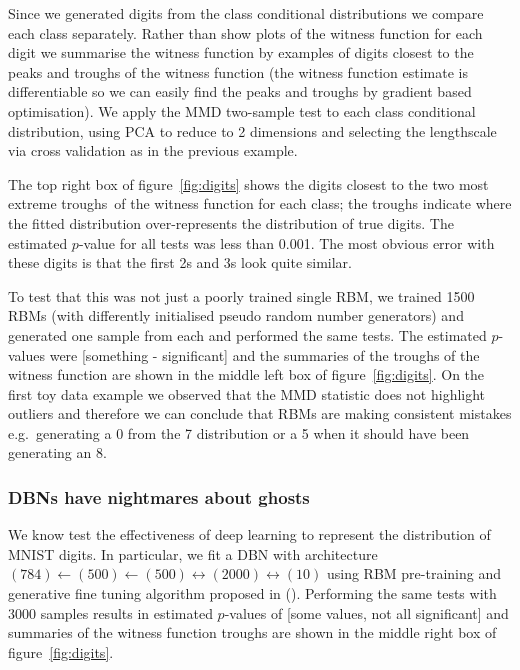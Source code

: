 \documentclass{article} %
\def\eg{e.g.\ }
\begin{document}
Since we generated digits from the class conditional distributions we compare each class separately.
Rather than show plots of the witness function for each digit we summarise the witness function by examples of digits closest to the peaks and troughs of the witness function (the witness function estimate is differentiable so we can easily find the peaks and troughs by gradient based optimisation).
We apply the MMD two-sample test to each class conditional distribution, using PCA to reduce to 2 dimensions and selecting the lengthscale via cross validation as in the previous example.

The top right box of figure~\ref{fig:digits} shows the digits closest to the two most extreme troughs\footnotemark~of the witness function for each class; the troughs indicate where the fitted distribution over-represents the distribution of true digits.
The estimated $p$-value for all tests was less than 0.001.
The most obvious error with these digits is that the first 2s and 3s look quite similar.

To test that this was not just a poorly trained single RBM, we trained 1500 RBMs (with differently initialised pseudo random number generators) and generated one sample from each and performed the same tests.
The estimated $p$-values were [something - significant] and the summaries of the troughs of the witness function are shown in the middle left box of figure~\ref{fig:digits}.
On the first toy data example we observed that the MMD statistic does not highlight outliers and therefore we can conclude that RBMs are making consistent mistakes \eg generating a 0 from the 7 distribution or a 5 when it should have been generating an 8.

\subsubsection{DBNs have nightmares about ghosts}

We know test the effectiveness of deep learning to represent the distribution of MNIST digits.
In particular, we fit a DBN with architecture $(784)\leftarrow(500)\leftarrow(500)\leftrightarrow(2000)\leftrightarrow(10)$ using RBM pre-training and generative fine tuning algorithm proposed in ().
Performing the same tests with 3000 samples results in estimated $p$-values of [some values, not all significant] and summaries of the witness function troughs are shown in the middle right box of figure~\ref{fig:digits}.
\end{document}
